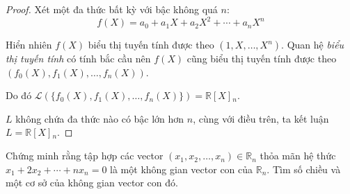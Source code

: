 \documentclass[class=linearalgebra,crop=false]{standalone}
\begin{document}
\begin{proof}
    \par Xét một đa thức bất kỳ với bậc không quá $n$:
        \[ f(X) = a_{0} + a_{1}X + a_{2}X^{2} + \cdots + a_{n}X^{n} \]
    \par Hiển nhiên $f(X)$ biểu thị tuyến tính được theo $(1, X, \ldots, X^{n})$. Quan hệ \textit{biểu thị tuyến tính} có tính bắc cầu nên $f(X)$ cũng biểu thị tuyến tính được theo $(f_{0}(X), f_{1}(X), \ldots, f_{n}(X))$.
    \par Do đó $\mathcal{L}(\{f_{0}(X), f_{1}(X),\ldots, f_{n}(X)\}) = \mathbb{R}[X]{}_{n}$.
    \par $L$ không chứa đa thức nào có bậc lớn hơn $n$, cùng với điều trên, ta kết luận $L = \mathbb{R}[X]{}_{n}$.
\end{proof}

\begin{exercise}Chứng minh rằng tập hợp các vector $(x_{1}, x_{2}, \ldots, x_{n})\in\mathbb{R}_{n}$ thỏa mãn hệ thức $x_{1} + 2x_{2} + \cdots + nx_{n} = 0$ là một không gian vector con của $\mathbb{R}_{n}$. Tìm số chiều và một cơ sở của không gian vector con đó.
\end{exercise}
\end{document}

